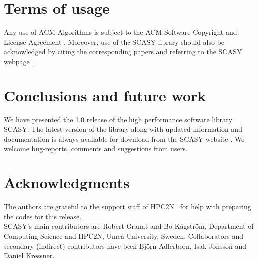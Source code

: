 \documentclass[11pt]{article}
\begin{document}
\section{Terms of usage}
Any use of ACM Algorithms is subject to the ACM Software Copyright and 
License Agreement \cite{ACMsoftwarecrnotice}.
Moreover, use of the SCASY library should also be acknowledged by citing the
corresponding papers \cite{granatkagstrom09a,granatkagstrom09b}
and referring to the SCASY webpage \cite{scasy}.

\section{Conclusions and future work}
\label{sec:conclusions} We have presented the 1.0 release of the
high performance software library SCASY. The latest version of the
library along with updated information and documentation is always
available for download from the SCASY website \cite{scasy}. We
welcome bug-reports, comments and suggestions from users.

\section*{Acknowledgments}
The authors are grateful to the support staff of
HPC2N~\cite{hpc2n} for help with preparing the codes for this
release. \\

\noindent SCASY's main contributors are Robert Granat and Bo
K{\aa}gstr{\"{o}}m, Department of Computing Science and HPC2N,
Ume{\aa} University, Sweden. Collaborators and secondary
(indirect) contributors have been Bj{\"{o}}rn Adlerborn, Isak
Jonsson and Daniel Kressner.
\end{document}
